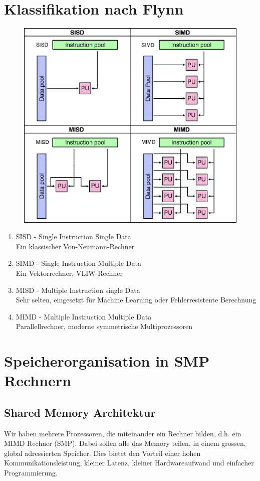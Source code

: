 \section{Klassifikation nach Flynn}
\begin{figure}
\centering
\includegraphics[width=0.7\linewidth]{fig/flynn}
\caption{}
\label{fig:flynn}
\end{figure}
\begin{enumerate}
	\item {SISD - Single Instruction Single Data} \\
		Ein klassischer Von-Neumann-Rechner
	\item {SIMD - Single Instruction Multiple Data} \\
		Ein Vektorrechner, VLIW-Rechner
	\item {MISD - Multiple Instruction single Data} \\
		Sehr selten, eingesetzt für Machine Learning oder Fehlerresistente Berechnung
	\item {MIMD - Multiple Instruction Multiple Data} \\
		Parallellrechner, moderne symmetrische Multiprozessoren
\end{enumerate}

\section{Speicherorganisation in SMP Rechnern}

\subsection{Shared Memory Architektur}
Wir haben mehrere Prozessoren, die miteinander ein Rechner bilden, d.h. ein MIMD Rechner (SMP). Dabei sollen alle das Memory teilen, in einem grossen, global adressierten Speicher. Dies bietet den Vorteil einer hohen Kommunikationsleistung, kleiner Latenz, kleiner Hardwareaufwand und einfacher Programmierung.

